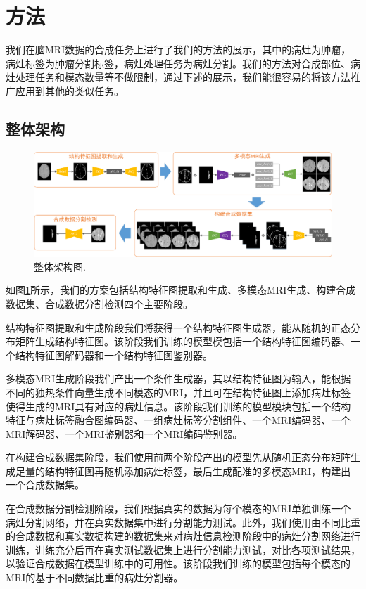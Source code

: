 \documentclass[letterpaper]{article} %
\begin{document}
\section{方法}

我们在脑MRI数据的合成任务上进行了我们的方法的展示，其中的病灶为肿瘤，病灶标签为肿瘤分割标签，病灶处理任务为病灶分割。我们的方法对合成部位、病灶处理任务和模态数量等不做限制，通过下述的展示，我们能很容易的将该方法推广应用到其他的类似任务。
\subsection{整体架构}
\begin{figure}
	\centering
	\includegraphics[width=0.98\linewidth]{figures/architecture}
	\caption{整体架构图.}
	\label{architecture}
\end{figure}

如图\ref{architecture}所示，我们的方案包括结构特征图提取和生成、多模态MRI生成、构建合成数据集、合成数据分割检测四个主要阶段。

结构特征图提取和生成阶段我们将获得一个结构特征图生成器，能从随机的正态分布矩阵生成结构特征图。该阶段我们训练的模型模包括一个结构特征图编码器、一个结构特征图解码器和一个结构特征图鉴别器。

多模态MRI生成阶段我们产出一个条件生成器，其以结构特征图为输入，能根据不同的独热条件向量生成不同模态的MRI，并且可在结构特征图上添加病灶标签使得生成的MRI具有对应的病灶信息。该阶段我们训练的模型模块包括一个结构特征与病灶标签融合图编码器、一组病灶标签分割组件、一个MRI编码器、一个MRI解码器、一个MRI鉴别器和一个MRI编码鉴别器。

在构建合成数据集阶段，我们使用前两个阶段产出的模型先从随机正态分布矩阵生成足量的结构特征图再随机添加病灶标签，最后生成配准的多模态MRI，构建出一个合成数据集。

在合成数据分割检测阶段，我们根据真实的数据为每个模态的MRI单独训练一个病灶分割网络，并在真实数据集中进行分割能力测试。此外，我们使用由不同比重的合成数据和真实数据构建的数据集来对病灶信息检测阶段中的病灶分割网络进行训练，训练充分后再在真实测试数据集上进行分割能力测试，对比各项测试结果，以验证合成数据在模型训练中的可用性。该阶段我们训练的模型包括每个模态的MRI的基于不同数据比重的病灶分割器。
\end{document}
